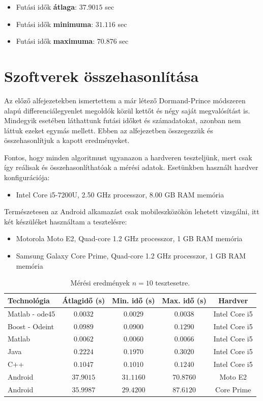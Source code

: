 \begin{itemize}
	\item Futási idők \textbf{átlaga}: $ 37.9015 $ sec
	\item Futási idők \textbf{minimuma}: $ 31.116 $ sec
	\item Futási idők \textbf{maximuma}: $ 70.876 $ sec
\end{itemize}

\section {Szoftverek összehasonlítása} \label{fejezet3_3}

Az előző alfejezetekben ismertettem a már létező Dormand-Prince módszeren alapú differenciálegyenlet megoldók közül kettőt és négy saját megvalósítást is. Mindegyik esetében láthattunk futási időket és számadatokat, azonban nem láttuk ezeket egymás mellett. Ebben az alfejezetben összegezzük és összehasonlítjuk a kapott eredményeket.

Fontos, hogy minden algoritmust ugyanazon a hardveren teszteljünk, mert csak így reálisak és összehasonlíthatóak a mérési adatok. Esetünkben használt hardver konfigurációja:
\begin{itemize}
	\item Intel Core i5-7200U, 2.50 GHz processzor, 8.00 GB RAM memória
\end{itemize}
Természetesen az Android alkamazást csak mobileszközökön lehetett vizsgálni, itt két készüléket használtam a tesztelésre:
\begin{itemize}
	\item Motorola Moto E2, Quad-core 1.2 GHz processzor, 1 GB RAM memória
	\item Samsung Galaxy Core Prime, Quad-core 1.2 GHz processzor, 1 GB RAM memória
\end{itemize}


\begin{table}[h!]
	\centering
	\begin{tabular}{ | l | c | c | c | c |}
		\hline 
		\textbf{Technológia} & \textbf{Átlagidő (s)} & \textbf{Min. idő (s)} & \textbf{Max. idő (s)} & \textbf{Hardver}\\
		\hline
		Matlab - ode45 & $ 0.0032 $ & $ 0.0029 $ & $ 0.0038 $ & Intel Core i5\\
		\hline
		Boost - Odeint & $ 0.0989 $ & $ 0.0900 $ & $ 0.1290 $ & Intel Core i5\\
		\hline
		Matlab & $ 0.0062 $ & $ 0.0060 $ & $ 0.0066 $ & Intel Core i5\\
		\hline
		Java & $ 0.2224 $ & $ 0.1970 $ & $ 0.3020 $ & Intel Core i5\\ 
		\hline
		C++ & $ 0.1047 $ & $ 0.1010 $ & $ 0.1240 $ & Intel Core i5\\
		\hline
		Android & $ 37.9015 $ & $ 31.1160 $ & $ 70.8760 $ & Moto E2\\
		\hline
		Android & $ 35.9987 $ & $ 29.4200 $ & $ 87.6120 $ & Core Prime\\
		\hline
	\end{tabular}
	\caption{Mérési eredmények  $ n = 10 $ tesztesetre.}
	\label{tablazat1}
\end{table}

